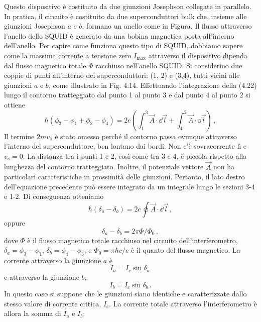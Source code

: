 Questo dispositivo è costituito da due giunzioni Josephson collegate in parallelo. In pratica, il circuito è costituito da due superconduttori bulk che, insieme alle giunzioni Josephson $a$ e $b$, formano un anello come in Figura. Il flusso attraverso l'anello dello SQUID è generato da una bobina magnetica posta all'interno dell'anello. Per capire come funziona questo tipo di SQUID, dobbiamo sapere come la massima corrente a tensione zero $I_{\text{max}}$ attraverso il dispositivo dipenda dal flusso magnetico totale $\Phi$ racchiuso nell'anello SQUID.
Si considerino due coppie di punti all'interno dei superconduttori: (1, 2) e (3,4), tutti vicini alle giunzioni $a$ e $b$, come illustrato in Fig. 4.14. Effettuando l'integrazione della (4.22) lungo il contorno tratteggiato dal punto 1 al punto 3 e dal punto 4 al punto 2 si ottiene
\begin{equation*}
    \hbar\left(\phi_3 - \phi_1 + \phi_2 - \phi_4\right)=2e\left(\int_1^3 \vec A \cdot \dd{\vec l} + \int_4^2 \vec A \cdot \dd{\vec l}\right) \, ,
\end{equation*}
Il termine $2mv_s$ è stato omesso perché il contorno passa ovunque attraverso l'interno del superconduttore, ben lontano dai bordi. Non c'è sovracorrente lì e $v_s = 0$. La distanza tra i punti 1 e 2, così come tra 3 e 4, è piccola rispetto alla lunghezza del contorno tratteggiato. Inoltre, il potenziale vettore $\vec A$ non ha particolari caratteristiche in prossimità delle giunzioni. Pertanto, il lato destro dell'equazione precedente può essere integrato da un integrale lungo le sezioni 3-4 e 1-2. Di conseguenza otteniamo
\begin{equation*}
    \hbar(\delta_a - \delta_b)=2e\oint \vec A \cdot \dd{\vec l} \, ,
\end{equation*}
oppure
\begin{equation*}
    \delta_a - \delta_b = 2\pi \Phi/\Phi_0 \, ,
\end{equation*}
dove $\Phi$ è il flusso magnetico totale racchiuso nel circuito dell'interferometro, $\delta_a=\phi_3-\phi_1$, $\delta_b=\phi_4-\phi_3$, e $\Phi_0=\pi\hbar c/e$ è il quanto del flusso magnetico.
La corrente attraverso la giunzione $a$ è
\begin{equation*}
    I_a = I_c\sin\delta_a \,
\end{equation*}
e attraverso la giunzione $b$,
\begin{equation*}
    I_b = I_c\sin\delta_b \, .
\end{equation*}
In questo caso si suppone che le giunzioni siano identiche e caratterizzate dallo stesso valore di corrente critica, $I_c$. La corrente totale attraverso l'interferometro è allora la somma di $I_a$ e $I_b$:
